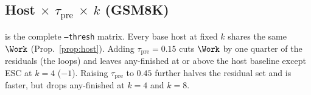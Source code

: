 \subsection{Host $\times$ $\tau_{\mathrm{pre}}$ $\times$ $k$ (GSM8K)}
\label{sec:ablate-thresh}

 is the complete \texttt{--thresh} matrix.
Every base host at fixed $k$ shares the same $\Work$ (Prop.~\ref{prop:host}).
Adding $\tau_{\mathrm{pre}}{=}0.15$ cuts $\Work$ by one quarter of the residuals (the loops)
and leaves any-finished at or above the host baseline except ESC at $k{=}4$ ($-1$).
Raising $\tau_{\mathrm{pre}}$ to $0.45$ further halves the residual set and is faster, but
drops any-finished at $k{=}4$ and $k{=}8$.

